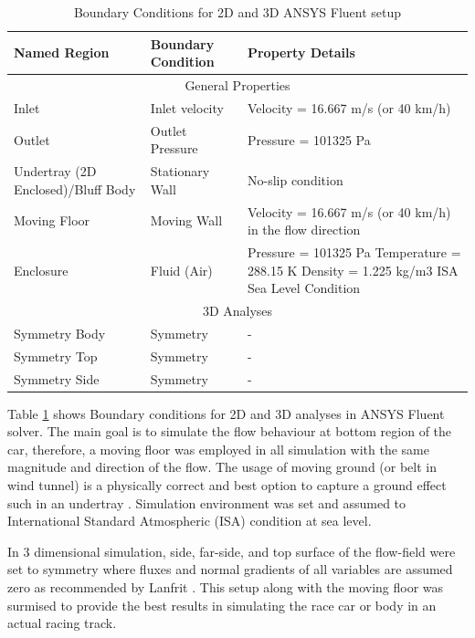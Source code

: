 \begin{table}[!ht]
    \centering
    \caption{Boundary Conditions for 2D and 3D ANSYS Fluent setup}
    \label{tab:Boundary Conditions}
    \vspace{-0.5cm}
\begin{center}
\begin{tabular}{||p{4cm}|p{4cm}|p{7cm}||}
 \hline
 Named Region & Boundary Condition & Property Details\\
 \hline \hline
 \multicolumn{3}{||c||}{General Properties} \\
 \hline
 
 Inlet & Inlet velocity & Velocity = 16.667 m/s (or 40 km/h)\\
 \hline
 Outlet & Outlet Pressure  & Pressure = 101325 Pa  \\
 \hline
 Undertray (2D Enclosed)/Bluff Body & Stationary Wall & No-slip condition\\
 \hline
 Moving Floor & Moving Wall & Velocity = 16.667 m/s (or 40 km/h) in the flow direction\\
 \hline
 Enclosure &   Fluid (Air)  & Pressure = 101325 Pa
Temperature = 288.15 K
Density = 1.225 kg/m3
ISA Sea Level Condition\\
 
 \hline
 \multicolumn{3}{||c||}{3D Analyses} \\
 \hline
 
 Symmetry Body & Symmetry  & -\\
 \hline
 Symmetry Top & Symmetry  & -\\
 \hline
 Symmetry Side & Symmetry & -\\
 \hline
 
\end{tabular}
\end{center}
\end{table}

\noindent Table \ref{tab:Boundary Conditions} shows Boundary conditions for 2D and 3D analyses in ANSYS Fluent solver. The main goal is to simulate the flow behaviour at bottom region of the car, therefore, a moving floor was employed in all simulation with the same magnitude and direction of the flow. The usage of moving ground (or belt in wind tunnel) is a physically correct and best option to capture a ground effect such in an undertray \cite{Zhang2006GroundCars}\cite{Burgin1986WINDEFFECT}. Simulation environment was set and assumed to International Standard Atmospheric (ISA) condition at sea level. 

\noindent In 3 dimensional simulation, side, far-side, and top surface of the flow-field were set to symmetry where fluxes and normal gradients of all variables are assumed zero \cite{ANSYS2009SymmetryConditions} as recommended by Lanfrit \cite{Lanfrit2005BestFLUENT}. This setup along with the moving floor was surmised to provide the best results in simulating the race car or body in an actual racing track.





